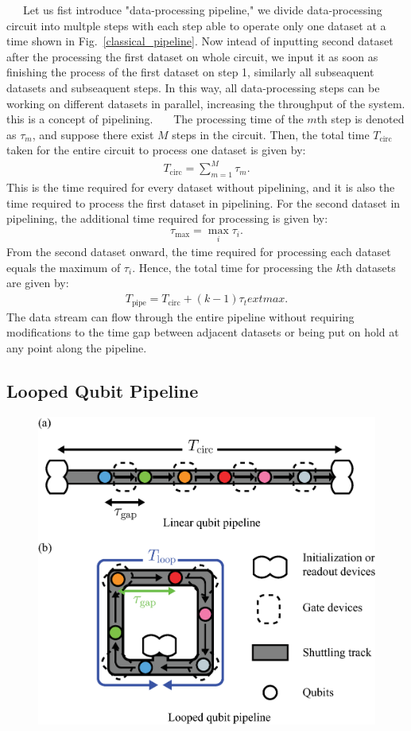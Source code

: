 \documentclass[a4paper,11pt]{ltjsarticle}
\begin{document}
{{        \ \ \ Let us fist introduce "data-processing pipeline," we divide data-processing circuit into multple steps with each step able to operate only one dataset at a time shown in Fig.~\ref{classical_pipeline}. Now intead of inputting second dataset after the processing the first dataset on whole circuit, we input it as soon as finishing the process of the first dataset on step 1, similarly all subseaquent datasets and subseaquent steps. In this way, all data-processing steps can be working on different datasets in parallel, increasing the throughput of the system. this is a concept of pipelining. 
        \ \ \ The processing time of the $m$th step is denoted as $\tau_m$, and suppose there exist $M$ steps in the circuit. Then, the total time $T_{\text{circ}}$ taken for the entire circuit to process one dataset is given by:
        \begin{align}
            T_\text{circ}=\sum_{m=1}^M\tau_m.
        \end{align}
        This is the time required for every dataset without pipelining, and it is also the time required to process the first dataset in pipelining. For the second dataset in pipelining, the additional time required for processing is given by:
        \begin{align}
            \tau_\text{max}=\max_i{\tau_i}.
        \end{align}
        From the second dataset onward, the time required for processing each dataset equals the maximum of $\tau_i$. Hence, the total time for processing the $k$th datasets are given by:
        \begin{align}
            T_\text{pipe}=T_\text{circ}+(k-1)\tau_text{max}.
        \end{align}
        The data stream can flow through the entire pipeline without requiring modifications to the time gap between adjacent datasets or being put on hold at any point along the pipeline.
    }
    \clearpage
    \subsection{Looped Qubit Pipeline}{
        \begin{figure}[h]
            \centering
            \includegraphics[scale=0.50]{figure/shuttling_track.eps}
            \vspace{0pt}\caption{}
            \label{shuttling_truck}
        \end{figure}
    }
}
\end{document}
